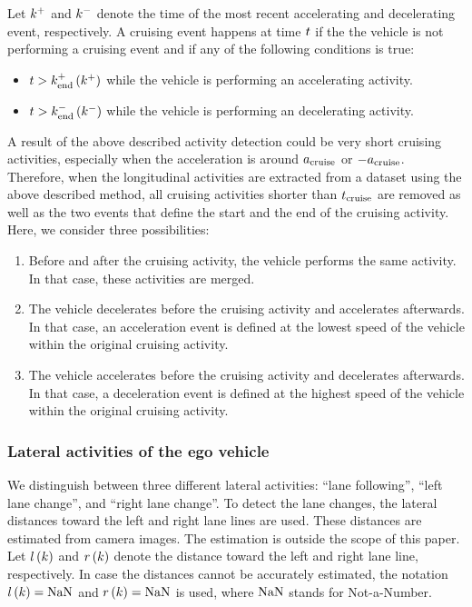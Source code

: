 Let $k^{+}$ and $k^{-}$ denote the time of the most recent accelerating and decelerating event, respectively. A cruising event happens at time $t$ if the the vehicle is not performing a cruising event and if any of the following conditions is true:
\begin{itemize}
	\item $t > k_{\mathrm{end}}^{+}\left(k^{+}\right)$ while the vehicle is performing an accelerating activity.
	\item $t > k_{\mathrm{end}}^{-}\left(k^{-}\right)$ while the vehicle is performing an decelerating activity.
\end{itemize}

A result of the above described activity detection could be very short cruising activities, especially when the acceleration is around $a_\mathrm{cruise}$ or $-a_\mathrm{cruise}$. Therefore, when the longitudinal activities are extracted from a dataset using the above described method, all cruising activities shorter than $t_\mathrm{cruise}$ are removed as well as the two events that define the start and the end of the cruising activity. Here, we consider three possibilities:
\begin{enumerate}
	\item Before and after the cruising activity, the vehicle performs the same activity. In that case, these activities are merged.
	\item The vehicle decelerates before the cruising activity and accelerates afterwards. In that case, an acceleration event is defined at the lowest speed of the vehicle within the original cruising activity.
	\item The vehicle accelerates before the cruising activity and decelerates afterwards. In that case, a deceleration event is defined at the highest speed of the vehicle within the original cruising activity.
\end{enumerate}



\subsubsection{Lateral activities of the ego vehicle}
\label{sec:lateral ego}


We distinguish between three different lateral activities: ``lane following'', ``left lane change'', and ``right lane change''. To detect the lane changes, the lateral distances toward the left and right lane lines are used. These distances are estimated from camera images. The estimation is outside the scope of this paper.  Let $l\left(k\right)$ and $r\left(k\right)$ denote the distance toward the left and right lane line, respectively. In case the distances cannot be accurately estimated, the notation $l\left(k\right)=\mathrm{NaN}$ and $r\left(k\right)=\mathrm{NaN}$ is used, where $\mathrm{NaN}$ stands for Not-a-Number.


